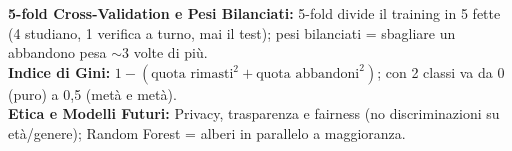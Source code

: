 \documentclass[10pt, a4paper]{article}
\begin{document}
\begin{minipage}{\linewidth}
{{\textbf{\color{PrimaryNavy}5-fold Cross-Validation e Pesi Bilanciati:} 5-fold divide il training in 5 fette (4 studiano, 1 verifica a turno, mai il test); pesi bilanciati = sbagliare un abbandono pesa $\sim$3 volte di più.\\[2.5pt]
\textbf{\color{PrimaryNavy}Indice di Gini:} $1 - (\text{quota rimasti}^2 + \text{quota abbandoni}^2)$; con 2 classi va da 0 (puro) a 0,5 (metà e metà).\\[2.5pt]
\textbf{\color{PrimaryNavy}Etica e Modelli Futuri:} Privacy, trasparenza e fairness (no discriminazioni su età/genere); Random Forest = alberi in parallelo a maggioranza.
}}
\end{minipage}
\end{document}
